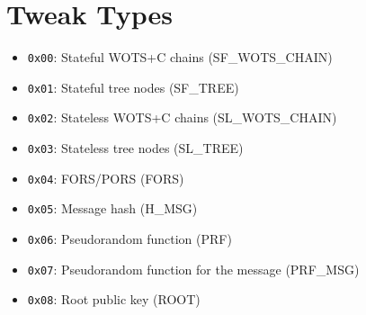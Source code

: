 \section{Tweak Types}

\begin{itemize}
    \item[] \texttt{0x00}: Stateful WOTS+C chains (SF\_WOTS\_CHAIN)
    \item[] \texttt{0x01}: Stateful tree nodes (SF\_TREE)
    \item[] \texttt{0x02}: Stateless WOTS+C chains (SL\_WOTS\_CHAIN)
    \item[] \texttt{0x03}: Stateless tree nodes (SL\_TREE)
    \item[] \texttt{0x04}: FORS/PORS (FORS)
    \item[] \texttt{0x05}: Message hash (H\_MSG)
    \item[] \texttt{0x06}: Pseudorandom function (PRF)
    \item[] \texttt{0x07}: Pseudorandom function for the message (PRF\_MSG)
    \item[] \texttt{0x08}: Root public key (ROOT)
\end{itemize}